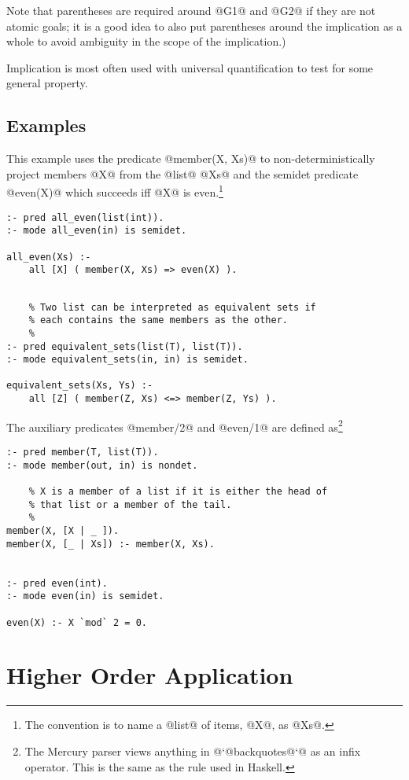 Note that parentheses are required around @G1@ and @G2@ if they
are not atomic goals; it is a good idea to also put
parentheses around the implication as a whole to avoid
ambiguity in the scope of the implication.)

Implication is most often used with universal quantification
to test for some general property.

\subsection{Examples}

This example uses the predicate @member(X, Xs)@ to non-deterministically
project members @X@ from the @list@ @Xs@ and the semidet predicate
@even(X)@ which succeeds iff @X@ is even.\footnote{The convention is to
name a @list@ of items, @X@, as @Xs@.}
\begin{verbatim}
:- pred all_even(list(int)).
:- mode all_even(in) is semidet.

all_even(Xs) :-
    all [X] ( member(X, Xs) => even(X) ).

\end{verbatim}

\begin{verbatim}

    % Two list can be interpreted as equivalent sets if
    % each contains the same members as the other.
    %
:- pred equivalent_sets(list(T), list(T)).
:- mode equivalent_sets(in, in) is semidet.

equivalent_sets(Xs, Ys) :-
    all [Z] ( member(Z, Xs) <=> member(Z, Ys) ).
\end{verbatim}
The auxiliary predicates @member/2@ and @even/1@ are defined as\footnote{The Mercury parser views anything in @`@backquotes@`@
as an infix operator.  This is the same as the rule used in Haskell.}
\begin{verbatim}
:- pred member(T, list(T)).
:- mode member(out, in) is nondet.

    % X is a member of a list if it is either the head of
    % that list or a member of the tail.
    %
member(X, [X | _ ]).
member(X, [_ | Xs]) :- member(X, Xs).


:- pred even(int).
:- mode even(in) is semidet.

even(X) :- X `mod` 2 = 0.
\end{verbatim}

\section{Higher Order Application}

